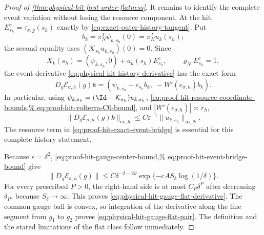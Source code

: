 \begin{proof}[Proof of
\cref{thm:physical-hit-first-order-flatness}]
It remains to identify the complete event variation without losing the
resource component.  At the hit,
\(E_{s_h}^c=\tau_{\sigma,g}(s_h)\) exactly by
\cref{eq:exact-outer-history-tangent}.  Put
\[
 b_k=\pi_N^T\psi_{k,s_h}(0)=\pi_N^Tu_k(s_h);
\]
the second equality uses
\((\mathcal K_{s_h}u_{k,s_h})(0)=0\).
Since
\[
 X_k(s_h)=(\psi_{k,s_h},0)+a_k(s_h)E_{s_h}^c,
 \qquad
 \varrho_N E_{s_h}^c=1,
\]
the event derivative
\cref{eq:physical-hit-history-derivative} has the exact form
\begin{equation}
 D_g\mathcal E_{\sigma,h}(g)k
 =\left(
   \psi_{k,s_h}-e_{s_h}b_k,\;
   -W'(e_{\sigma,h})b_k
   \right).                                      \label{eq:proof-hit-exact-event-bridge}
\end{equation}
In particular, using
\(\psi_{k,s_h}=(\Id-\mathcal K_{s_h})u_{k,s_h}\),
\cref{eq:proof-hit-resource-coordinate-bounds,%
eq:proof-hit-volterra-C0-bound}, and
\(|W'(e_{\sigma,h})|\asymp r_h\),
\begin{equation}
 \|D_g\mathcal E_{\sigma,h}(g)k\|_{\mathrm{ev},h}
 \le C\varepsilon^{-1}\|u_{k,s_h}\|_{\infty,N}.   \label{eq:proof-hit-event-bridge-bound}
\end{equation}
The resource term in
\cref{eq:proof-hit-exact-event-bridge} is essential for this complete
history statement.

Because \(\varepsilon=\delta^2\),
\cref{eq:proof-hit-gauge-center-bound,%
eq:proof-hit-event-bridge-bound}
give
\begin{equation}
 \|D_g\mathcal E_{\sigma,h}(g)\|
 \le C\delta^{-2-2\vartheta}
       \exp\{-cA S_\delta\log(1/\delta)\}.         \label{eq:proof-hit-flat-envelope}
\end{equation}
For every prescribed \(P>0\), the right-hand side is at most
\(C_P\delta^P\) after decreasing \(\delta_P\), because
\(S_\delta\to\infty\).  This proves
\cref{eq:physical-hit-gauge-flat-derivative}.  The common gauge ball is
convex, so integration of the derivative along the line segment from
\(g_1\) to \(g_2\) proves
\cref{eq:physical-hit-gauge-flat-pair}.  The definition and the stated
limitations of the flat class follow immediately.
\end{proof}

